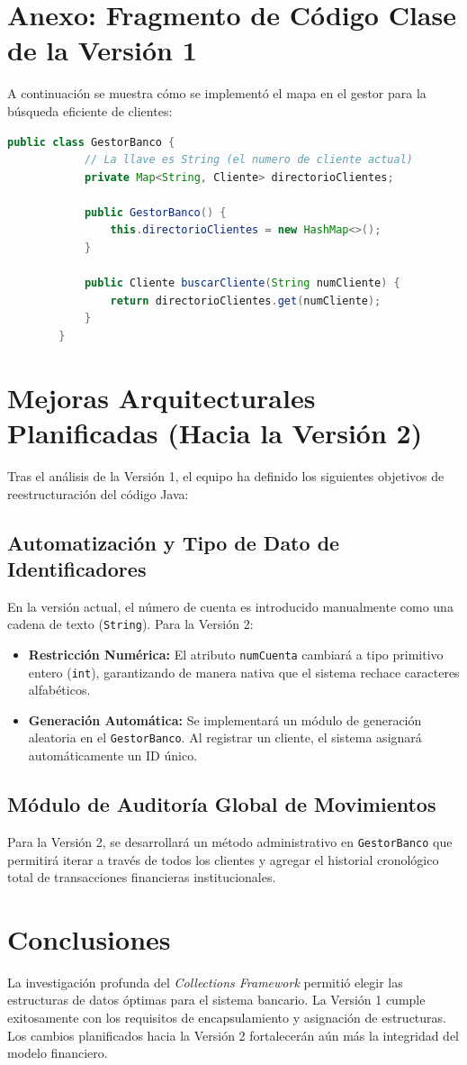 \documentclass[12pt, letterpaper]{article}
\begin{document}
	\section{Anexo: Fragmento de Código Clase de la Versión 1}
	A continuación se muestra cómo se implementó el mapa en el gestor para la búsqueda eficiente de clientes:
	
	\begin{lstlisting}[language=Java, caption=Búsqueda Eficiente en GestorBanco]
		public class GestorBanco {
			// La llave es String (el numero de cliente actual)
			private Map<String, Cliente> directorioClientes;
			
			public GestorBanco() {
				this.directorioClientes = new HashMap<>();
			}
			
			public Cliente buscarCliente(String numCliente) {
				return directorioClientes.get(numCliente); 
			}
		}
	\end{lstlisting}
	
	\newpage
	\section{Mejoras Arquitecturales Planificadas (Hacia la Versión 2)}
	Tras el análisis de la Versión 1, el equipo ha definido los siguientes objetivos de reestructuración del código Java:
	
	\subsection{Automatización y Tipo de Dato de Identificadores}
	En la versión actual, el número de cuenta es introducido manualmente como una cadena de texto (\texttt{String}). Para la Versión 2:
	\begin{itemize}
		\item \textbf{Restricción Numérica:} El atributo \texttt{numCuenta} cambiará a tipo primitivo entero (\texttt{int}), garantizando de manera nativa que el sistema rechace caracteres alfabéticos.
		\item \textbf{Generación Automática:} Se implementará un módulo de generación aleatoria en el \texttt{GestorBanco}. Al registrar un cliente, el sistema asignará automáticamente un ID único.
	\end{itemize}
	
	\subsection{Módulo de Auditoría Global de Movimientos}
	Para la Versión 2, se desarrollará un método administrativo en \texttt{GestorBanco} que permitirá iterar a través de todos los clientes y agregar el historial cronológico total de transacciones financieras institucionales.
	
	\section{Conclusiones}
	La investigación profunda del \textit{Collections Framework} permitió elegir las estructuras de datos óptimas para el sistema bancario. La Versión 1 cumple exitosamente con los requisitos de encapsulamiento y asignación de estructuras. Los cambios planificados hacia la Versión 2 fortalecerán aún más la integridad del modelo financiero.
	
\end{document}
